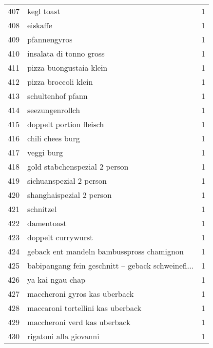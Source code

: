 \begin{tabular}{llr}
407 &                                         kegl toast &      1 \\
408 &                                           eiskaffe &      1 \\
409 &                                       pfannengyros &      1 \\
410 &                            insalata di tonno gross &      1 \\
411 &                            pizza buongustaia klein &      1 \\
412 &                               pizza broccoli klein &      1 \\
413 &                                  schultenhof pfann &      1 \\
414 &                                    seezungenrollch &      1 \\
415 &                            doppelt portion fleisch &      1 \\
416 &                                   chili chees burg &      1 \\
417 &                                         veggi burg &      1 \\
418 &                      gold stabchenspezial 2 person &      1 \\
419 &                            sichuanspezial 2 person &      1 \\
420 &                           shanghaispezial 2 person &      1 \\
421 &                                          schnitzel &      1 \\
422 &                                         damentoast &      1 \\
423 &                                 doppelt currywurst &      1 \\
424 &          geback ent mandeln bambusspross chamignon &      1 \\
425 &  babipangang fein geschnitt – geback schweinefl... &      1 \\
426 &                                   ya kai ngau chap &      1 \\
427 &                      maccheroni gyros kas uberback &      1 \\
428 &                  maccaroni tortellini kas uberback &      1 \\
429 &                       maccheroni verd kas uberback &      1 \\
430 &                             rigatoni alla giovanni &      1 \\

\end{tabular}
